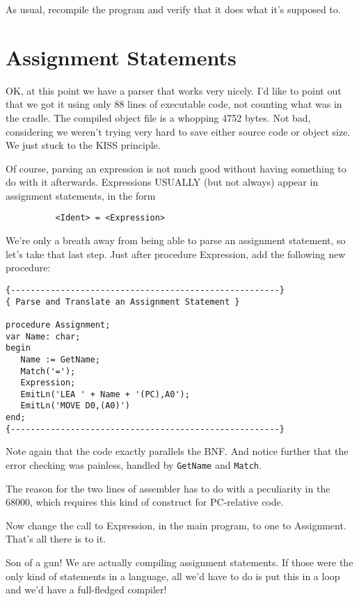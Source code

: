 As usual, recompile the program and verify that it does what it's supposed to.

\section{Assignment Statements}

OK, at  this  point we have a parser that works very nicely. I'd like to  point  out  that  we  got  it  using  only  88  lines of executable code, not  counting  what  was  in  the  cradle. The compiled  object  file  is  a  whopping  4752  bytes. Not  bad, considering we weren't trying very  hard  to  save  either source code or object size. We just stuck to the KISS principle.

Of course, parsing an expression  is not much good without having something to do with it afterwards. Expressions USUALLY (but not always) appear in assignment statements, in the form

\begin{verbatim}
          <Ident> = <Expression>
\end{verbatim}

We're only a breath  away  from being able to parse an assignment statement, so let's take that  last  step. Just  after procedure Expression, add the following new procedure:

\begin{verbatim}
{------------------------------------------------------}
{ Parse and Translate an Assignment Statement }

procedure Assignment;
var Name: char;
begin
   Name := GetName;
   Match('=');
   Expression;
   EmitLn('LEA ' + Name + '(PC),A0');
   EmitLn('MOVE D0,(A0)')
end;
{------------------------------------------------------}
\end{verbatim}

Note again that the  code  exactly parallels the BNF. And notice further that  the error checking was painless, handled by {\tt GetName} and {\tt Match}.

The reason for the two  lines  of  assembler  has  to  do  with a peculiarity in the  68000, which requires this kind of construct for PC-relative code.

Now change the call to Expression, in the main program, to one to Assignment. That's all there is to it.

Son of a gun!  We are actually  compiling  assignment statements. If those were the only kind of statements in a language, all we'd have to  do  is  put  this in a loop and we'd have a full-fledged compiler!

